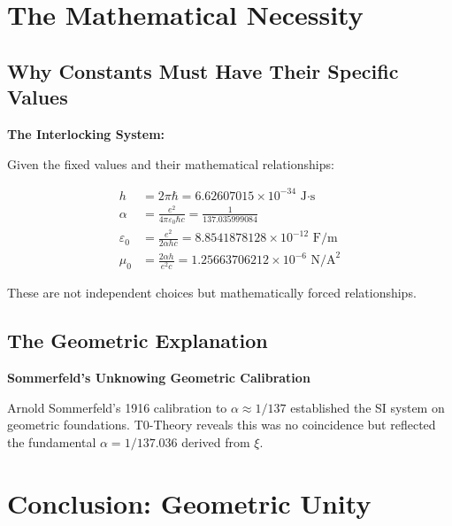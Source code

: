 \documentclass[12pt,a4paper]{article}
\begin{document}
	\section{The Mathematical Necessity}
	
	\subsection{Why Constants Must Have Their Specific Values}
	
	\begin{derivation}
		\textbf{The Interlocking System:}
		
		Given the fixed values and their mathematical relationships:
		
		\begin{align}
			h &= 2\pi\hbar = 6.62607015 \times 10^{-34} \text{ J·s} \\
			\alpha &= \frac{e^2}{4\pi\varepsilon_0\hbar c} = \frac{1}{137.035999084} \\
			\varepsilon_0 &= \frac{e^2}{2\alpha h c} = 8.8541878128 \times 10^{-12} \text{ F/m} \\
			\mu_0 &= \frac{2\alpha h}{e^2 c} = 1.25663706212 \times 10^{-6} \text{ N/A}^2
		\end{align}
		
		These are not independent choices but mathematically forced relationships.
	\end{derivation}
	
	\subsection{The Geometric Explanation}
	
	\begin{historical}
		\textbf{Sommerfeld's Unknowing Geometric Calibration}
		
		Arnold Sommerfeld's 1916 calibration to $\alpha \approx 1/137$ established the SI system on geometric foundations. T0-Theory reveals this was no coincidence but reflected the fundamental $\alpha = 1/137.036$ derived from $\xi$.
	\end{historical}
	
	\section{Conclusion: Geometric Unity}
	
\end{document}
